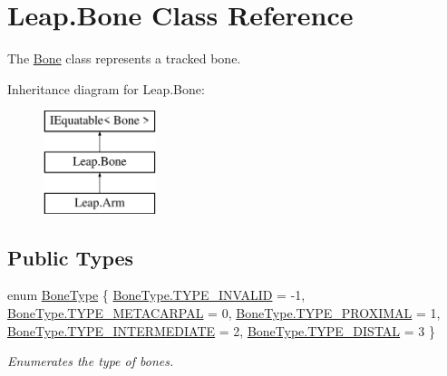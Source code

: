 \hypertarget{class_leap_1_1_bone}{}\section{Leap.\+Bone Class Reference}
\label{class_leap_1_1_bone}


The \mbox{\hyperlink{class_leap_1_1_bone}{Bone}} class represents a tracked bone.  


Inheritance diagram for Leap.\+Bone\+:\begin{figure}[H]
\begin{center}
\leavevmode
\includegraphics[height=3.000000cm]{class_leap_1_1_bone}
\end{center}
\end{figure}
\subsection*{Public Types}
\begin{DoxyCompactItemize}
\item 
enum \mbox{\hyperlink{class_leap_1_1_bone_a21054e31cefa7b75f25a026006fdbb1b}{Bone\+Type}} \{ \newline
\mbox{\hyperlink{class_leap_1_1_bone_a21054e31cefa7b75f25a026006fdbb1ba0fec0d0c3308929a666b6e0e02f94a6d}{Bone\+Type.\+T\+Y\+P\+E\+\_\+\+I\+N\+V\+A\+L\+ID}} = -\/1, 
\mbox{\hyperlink{class_leap_1_1_bone_a21054e31cefa7b75f25a026006fdbb1ba711438f98489249610b9a4af0fd4c684}{Bone\+Type.\+T\+Y\+P\+E\+\_\+\+M\+E\+T\+A\+C\+A\+R\+P\+AL}} = 0, 
\mbox{\hyperlink{class_leap_1_1_bone_a21054e31cefa7b75f25a026006fdbb1ba703123d4643846a00cc1fa9918555ea3}{Bone\+Type.\+T\+Y\+P\+E\+\_\+\+P\+R\+O\+X\+I\+M\+AL}} = 1, 
\mbox{\hyperlink{class_leap_1_1_bone_a21054e31cefa7b75f25a026006fdbb1ba8d41e97ce589f9fae8052d4c604bf6a7}{Bone\+Type.\+T\+Y\+P\+E\+\_\+\+I\+N\+T\+E\+R\+M\+E\+D\+I\+A\+TE}} = 2, 
\newline
\mbox{\hyperlink{class_leap_1_1_bone_a21054e31cefa7b75f25a026006fdbb1bac2d342e17f0c97e224c258a3ba1f7e0c}{Bone\+Type.\+T\+Y\+P\+E\+\_\+\+D\+I\+S\+T\+AL}} = 3
 \}
\begin{DoxyCompactList}\small\item\em Enumerates the type of bones. \end{DoxyCompactList}\end{DoxyCompactItemize}
